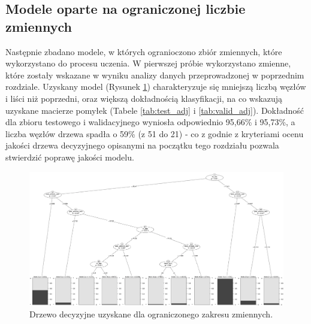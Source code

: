 \subsection{Modele oparte na ograniczonej liczbie zmiennych}

Następnie zbadano modele, w których ogranioczono zbiór zmiennych, które wykorzystano do procesu uczenia. W pierwszej próbie wykorzystano zmienne, które zostały wskazane w wyniku analizy danych przeprowadzonej w poprzednim rozdziale. Uzyskany model (Rysunek \ref{tree:adjusted}) charakteryzuje się mniejszą liczbą węzłów i liści niż poprzedni, oraz większą dokładnością klasyfikacji, na co wskazują uzyskane macierze pomyłek (Tabele \ref{tab:test_adj} i \ref{tab:valid_adj}). Dokładność dla zbioru testowego i walidacyjnego wyniosła odpowiednio 95,66\% i 95,73\%, a liczba węzłów drzewa spadła o 59\% (z 51 do 21) - co z godnie z kryteriami ocenu jakości drzewa decyzyjnego opisanymi na początku tego rozdziału pozwala stwierdzić poprawę jakości modelu.

\begin{figure}
    \centering
    \includegraphics[scale=0.25]{img/tree_adjusted.png}
    \caption{Drzewo decyzyjne uzyskane dla ograniczonego zakresu zmiennych.}
    \label{tree:adjusted}
\end{figure}


